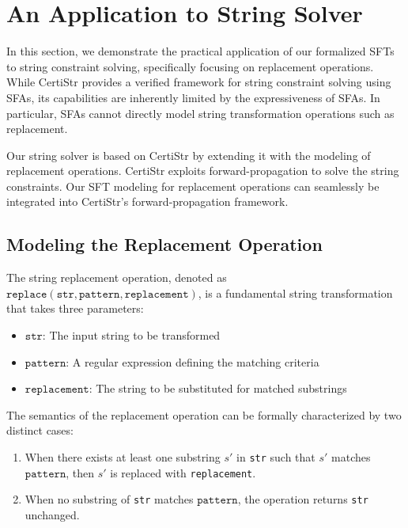 \documentclass[a4paper,UKenglish,cleveref, autoref, anonymous, thm-restate]{lipics-v2021}
\begin{document}
\section{An Application to String Solver}
\label{sec-app-str-solver}

In this section, we demonstrate the practical application of our formalized SFTs to string constraint solving, specifically focusing on replacement operations. While CertiStr \cite{cpp/KanLRS22} provides a verified framework for string constraint solving using SFAs, its capabilities are inherently limited by the expressiveness of SFAs. In particular, SFAs cannot directly model string transformation operations such as replacement.

Our string solver is based on CertiStr \cite{cpp/KanLRS22} by extending it with the modeling of replacement operations. CertiStr exploits forward-propagation to solve the string constraints. Our SFT modeling for replacement operations can seamlessly be integrated into CertiStr's forward-propagation framework.



\subsection{Modeling the Replacement Operation}


The string replacement operation, denoted as $\texttt{replace}(\texttt{str}, \texttt{pattern}, \texttt{replacement})$, is a fundamental string transformation that takes three parameters:
\begin{itemize}
  \item $\texttt{str}$: The input string to be transformed
  \item $\texttt{pattern}$: A regular expression defining the matching criteria
  \item $\texttt{replacement}$: The string to be substituted for matched substrings
\end{itemize}

The semantics of the replacement operation can be formally characterized by two distinct cases:
\begin{enumerate}
  \item When there exists at least one substring $s'$ in \texttt{str} such that $s'$ matches $\texttt{pattern}$, then $s'$ is replaced with \texttt{replacement}.
  \item When no substring of \texttt{str} matches $\texttt{pattern}$, the operation returns \texttt{str} unchanged.
\end{enumerate}
\end{document}

